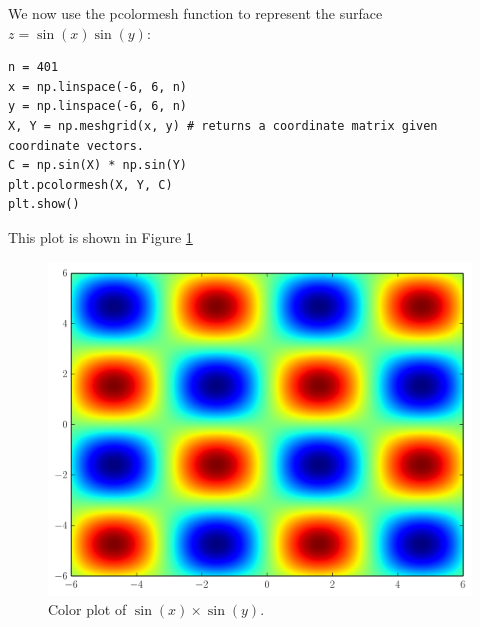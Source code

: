 We now use the pcolormesh function to represent the surface $z=\sin(x)\sin(y)$:
\begin{lstlisting}
n = 401
x = np.linspace(-6, 6, n)
y = np.linspace(-6, 6, n)
X, Y = np.meshgrid(x, y) # returns a coordinate matrix given coordinate vectors.
C = np.sin(X) * np.sin(Y)
plt.pcolormesh(X, Y, C)
plt.show()
\end{lstlisting}
This plot is shown in Figure \ref{fig:pcmexample}
\begin{figure}
\includegraphics[width=\textwidth]{sinxsiny.png}
\caption{Color plot of $\sin\left(x\right)\times\sin\left(y\right)$.}
\label{fig:pcmexample}
\end{figure}

